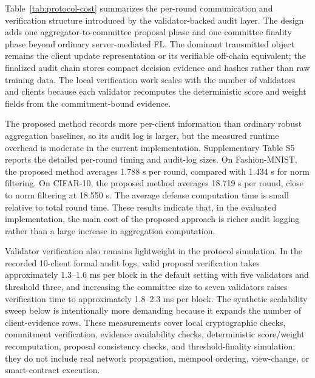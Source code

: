 \documentclass[preprint,12pt]{elsarticle}
\begin{document}
Table~\ref{tab:protocol-cost} summarizes the per-round communication and verification structure introduced by the validator-backed audit layer. The design adds one aggregator-to-committee proposal phase and one committee finality phase beyond ordinary server-mediated FL. The dominant transmitted object remains the client update representation or its verifiable off-chain equivalent; the finalized audit chain stores compact decision evidence and hashes rather than raw training data. The local verification work scales with the number of validators and clients because each validator recomputes the deterministic score and weight fields from the commitment-bound evidence.

The proposed method records more per-client information than ordinary robust aggregation baselines, so its audit log is larger, but the measured runtime overhead is moderate in the current implementation. Supplementary Table S5 reports the detailed per-round timing and audit-log sizes. On Fashion-MNIST, the proposed method averages 1.788 s per round, compared with 1.434 s for norm filtering. On CIFAR-10, the proposed method averages 18.719 s per round, close to norm filtering at 18.550 s. The average defense computation time is small relative to total round time. These results indicate that, in the evaluated implementation, the main cost of the proposed approach is richer audit logging rather than a large increase in aggregation computation.

Validator verification also remains lightweight in the protocol simulation. In the recorded 10-client formal audit logs, valid proposal verification takes approximately 1.3--1.6 ms per block in the default setting with five validators and threshold three, and increasing the committee size to seven validators raises verification time to approximately 1.8--2.3 ms per block. The synthetic scalability sweep below is intentionally more demanding because it expands the number of client-evidence rows. These measurements cover local cryptographic checks, commitment verification, evidence availability checks, deterministic score/weight recomputation, proposal consistency checks, and threshold-finality simulation; they do not include real network propagation, mempool ordering, view-change, or smart-contract execution.
\end{document}
